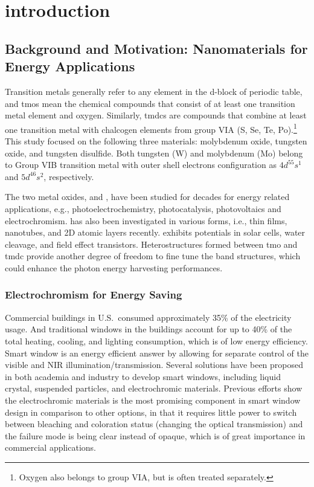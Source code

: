 
\chapter{introduction}

\section{Background and Motivation: Nanomaterials for Energy Applications}

Transition metals generally refer to any element in the d-block of periodic table, and \glspl{tmo} mean the chemical compounds that consist of at least one transition metal element and oxygen. Similarly, \glspl{tmdc} are compounds that combine at least one transition metal with chalcogen elements from group VIA (S, Se, Te, Po).\footnote{Oxygen also belongs to group VIA, but is often treated separately.} This study focused on the following three materials: molybdenum oxide, tungsten oxide, and tungsten disulfide. Both tungsten (W) and molybdenum (Mo) belong to Group VIB transition metal with outer shell electrons configuration as $4d^55s^1$ and $5d^46s^2$, respectively. 
 
The two metal oxides,  and , have been studied for decades for energy related applications, e.g., photoelectrochemistry,\cite{Su2010} photocatalysis,\cite{Watcharenwong2008, Macphee2010} photovoltaics\cite{Coridan2013} and electrochromism.\cite{Yoshimura1985, Mortimer2011}  has also been investigated in various forms, i.e., thin films, nanotubes, and 2D atomic layers recently.  exhibits potentials in solar cells,\cite{Britnell2013} water cleavage,\cite{Ballif1999} and field effect transistors.\cite{Perkins2013} Heterostructures formed between \gls{tmo} and \gls{tmdc} provide another degree of freedom to fine tune the band structures, which could enhance the photon energy harvesting performances. 

\subsection{Electrochromism for Energy Saving}

Commercial buildings in U.S.\ consumed approximately 35\% of the electricity usage.\cite{us2008} And traditional windows in the buildings account for up to 40\% of the total heating, cooling, and lighting consumption, which is of low energy efficiency. Smart window is an energy efficient answer by allowing for separate control of the visible and NIR illumination/transmission. Several solutions have been proposed in both academia and industry to develop smart windows, including liquid crystal, suspended particles, and electrochromic materials.\cite{Lampert1998} Previous efforts\cite{Deb2008} show the electrochromic materials is the most promising component in smart window design in comparison to other options, in that it requires little power to switch between bleaching and coloration status (changing the optical transmission) and the failure mode is being clear instead of opaque, which is of great importance in commercial applications.

